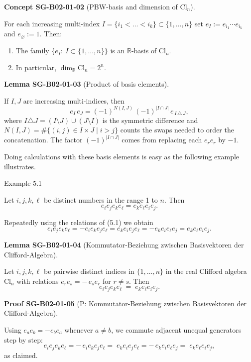 \documentclass[10pt, letterpaper]{article}
\newcommand{\R}{\mathbb{R}}
\newcommand{\Cl}{\mathrm{Cl}}
\newcommand{\CustomHeading}[3]{%
  \par\medskip\noindent%
  \textbf{#1 #2} \textnormal{(#3)}.\enskip%
}
\newenvironment{LEM}[2]{\begin{unitbox}\CustomHeading{Lemma}{#1}{#2}}{\end{unitbox}}
\newenvironment{CONC}[2]{\begin{unitbox}\CustomHeading{Concept}{#1}{#2}}{\end{unitbox}}
\newenvironment{PROOF}[2]{\begin{unitbox}\CustomHeading{Proof}{#1}{#2}}{\end{unitbox}}
\begin{document}
\begin{CONC}{SG-B02-01-02}{PBW-basis and dimension of \(\Cl_n\)}
For each increasing multi-index \(I=\{i_1<\dots<i_k\}\subset\{1,\dots,n\}\) set
\(e_I:=e_{i_1}\cdots e_{i_k}\) and \(e_\varnothing:=1\). Then:
\begin{enumerate}
\item The family \(\{e_I:\ I\subset\{1,\dots,n\}\}\) is an \(\R\)-basis of \(\Cl_n\).
\item In particular, \(\dim_\R \Cl_n=2^n\).
\end{enumerate}
\end{CONC}



\begin{LEM}{SG-B02-01-03}{Product of basis elements}
If \(I,J\) are increasing multi-indices, then
\[
e_I\,e_J
= (-1)^{N(I,J)}\,(-1)^{|I\cap J|}\,e_{\,I\,\triangle\,J},
\]
where \(I\triangle J=(I\setminus J)\cup(J\setminus I)\) is the symmetric
difference and \(N(I,J)=\#\{(i,j)\in I\times J\mid i>j\}\) counts the swaps
needed to order the concatenation. The factor \((-1)^{|I\cap J|}\) comes from
replacing each \(e_r e_r\) by \(-1\).
\end{LEM}





Doing calculations with these basis elements is easy as the following example illustrates.



Example 5.1


Let $i, j, k, \ell$ be distinct numbers in the range 1 to $n$. Then
$$
e_{i} e_{j} e_{k} e_{\ell}=e_{k} e_{\ell} e_{i} e_{j} .
$$


Repeatedly using the relations of (5.1) we obtain
$$
e_{i} e_{j} e_{k} e_{\ell}=-e_{i} e_{k} e_{j} e_{\ell}=e_{k} e_{i} e_{j} e_{\ell}=-e_{k} e_{i} e_{\ell} e_{j}=e_{k} e_{\ell} e_{i} e_{j} .
$$



\begin{LEM}{SG-B02-01-04}{Kommutator-Beziehung zwischen Basisvektoren der Clifford-Algebra}
Let \(i,j,k,\ell\) be pairwise distinct indices in \(\{1,\dots,n\}\) in the real
Clifford algebra \(\Cl_n\) with relations \(e_r e_s=-\,e_s e_r\) for \(r\neq s\).
Then
\[
e_i e_j e_k e_\ell \;=\; e_k e_\ell e_i e_j .
\]
\end{LEM}



\begin{PROOF}{SG-B02-01-05}{P: Kommutator-Beziehung zwischen Basisvektoren der Clifford-Algebra}
Using \(e_a e_b=-e_b e_a\) whenever \(a\neq b\), we commute adjacent unequal
generators step by step:
\[
e_i e_j e_k e_\ell
= -\,e_i e_k e_j e_\ell
= \;e_k e_i e_j e_\ell
= -\,e_k e_i e_\ell e_j
= \;e_k e_\ell e_i e_j,
\]
as claimed.
\end{PROOF}
\end{document}
